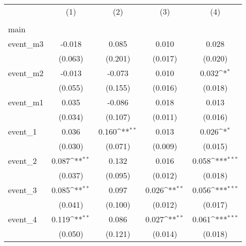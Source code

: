 {
\def\sym#1{\ifmmode^{#1}\else\(^{#1}\)\fi}
\begin{tabular}{l*{4}{c}}
\hline\hline
                    &\multicolumn{1}{c}{(1)}&\multicolumn{1}{c}{(2)}&\multicolumn{1}{c}{(3)}&\multicolumn{1}{c}{(4)}\\
                    &\multicolumn{1}{c}{} &\multicolumn{1}{c}{} &\multicolumn{1}{c}{} &\multicolumn{1}{c}{} \\
\hline
main                &                     &                     &                     &                     \\
event\_m3            &      -0.018         &       0.085         &       0.010         &       0.028         \\
                    &     (0.063)         &     (0.201)         &     (0.017)         &     (0.020)         \\
[1em]
event\_m2            &      -0.013         &      -0.073         &       0.010         &       0.032\sym{*}  \\
                    &     (0.055)         &     (0.155)         &     (0.016)         &     (0.018)         \\
[1em]
event\_m1            &       0.035         &      -0.086         &       0.018         &       0.013         \\
                    &     (0.034)         &     (0.107)         &     (0.011)         &     (0.016)         \\
[1em]
event\_1             &       0.036         &       0.160\sym{**} &       0.013         &       0.026\sym{*}  \\
                    &     (0.030)         &     (0.071)         &     (0.009)         &     (0.015)         \\
[1em]
event\_2             &       0.087\sym{**} &       0.132         &       0.016         &       0.058\sym{***}\\
                    &     (0.037)         &     (0.095)         &     (0.012)         &     (0.018)         \\
[1em]
event\_3             &       0.085\sym{**} &       0.097         &       0.026\sym{**} &       0.056\sym{***}\\
                    &     (0.041)         &     (0.100)         &     (0.012)         &     (0.017)         \\
[1em]
event\_4             &       0.119\sym{**} &       0.086         &       0.027\sym{**} &       0.061\sym{***}\\
                    &     (0.050)         &     (0.121)         &     (0.014)         &     (0.018)         \\

\end{tabular}}
